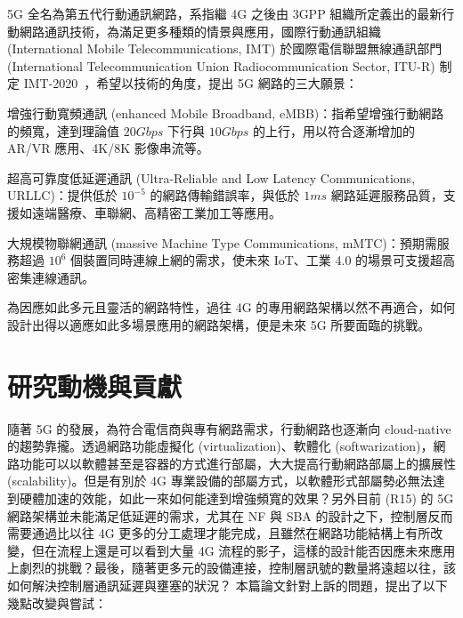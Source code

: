 5G 全名為第五代行動通訊網路，系指繼 4G 之後由 3GPP 組織所定義出的最新行動網路通訊技術，為滿足更多種類的情景與應用，國際行動通訊組織 (International Mobile Telecommunications, IMT) 於國際電信聯盟無線通訊部門 (International Telecommunication Union Radiocommunication Sector, ITU-R) 制定 IMT-2020~\cite{IMT_2020}，希望以技術的角度，提出 5G 網路的三大願景：
\begin{enumerate*}
\item 增強行動寬頻通訊 (enhanced Mobile Broadband, eMBB)：指希望增強行動網路的頻寬，達到理論值 $20 Gbps$ 下行與 $10 Gbps$ 的上行，用以符合逐漸增加的 AR/VR 應用、4K/8K 影像串流等。
\item 超高可靠度低延遲通訊 (Ultra-Reliable and Low Latency Communications, URLLC)：提供低於 $10^{-5}$ 的網路傳輸錯誤率，與低於 $1 ms$ 網路延遲服務品質，支援如遠端醫療、車聯網、高精密工業加工等應用。
\item 大規模物聯網通訊 (massive Machine Type Communications, mMTC)：預期需服務超過 $10^{6}$ 個裝置同時連線上網的需求，使未來 IoT、工業 4.0 的場景可支援超高密集連線通訊。
\end{enumerate*}

為因應如此多元且靈活的網路特性，過往 4G 的專用網路架構以然不再適合，如何設計出得以適應如此多場景應用的網路架構，便是未來 5G 所要面臨的挑戰。

\section{研究動機與貢獻}
\label{sec:motivation_and_contribution}
隨著 5G 的發展，為符合電信商與專有網路需求，行動網路也逐漸向 cloud-native 的趨勢靠攏。透過網路功能虛擬化 (virtualization)、軟體化 (softwarization)，網路功能可以以軟體甚至是容器的方式進行部屬，大大提高行動網路部屬上的擴展性 (scalability)。但是有別於 4G 專業設備的部屬方式，以軟體形式部屬勢必無法達到硬體加速的效能，如此一來如何能達到增強頻寬的效果？另外目前 (R15) 的 5G 網路架構並未能滿足低延遲的需求，尤其在 NF 與 SBA 的設計之下，控制層反而需要通過比以往 4G 更多的分工處理才能完成，且雖然在網路功能結構上有所改變，但在流程上還是可以看到大量 4G 流程的影子，這樣的設計能否因應未來應用上劇烈的挑戰？最後，隨著更多元的設備連接，控制層訊號的數量將遠超以往，該如何解決控制層通訊延遲與壅塞的狀況？
本篇論文針對上訴的問題，提出了以下幾點改變與嘗試：

